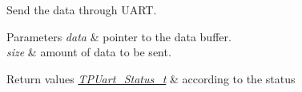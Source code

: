 Send the data through U\+A\+RT. 


\begin{DoxyParams}{Parameters}
{\em data} & pointer to the data buffer. \\
\hline
{\em size} & amount of data to be sent. \\
\hline
\end{DoxyParams}

\begin{DoxyRetVals}{Return values}
{\em \hyperlink{group___k_n_x___t_p_uart___exported___types_ga75271248dbdd8cec608012ca76739f36}{T\+P\+Uart\+\_\+\+Status\+\_\+t}} & according to the status \\
\hline
\end{DoxyRetVals}
